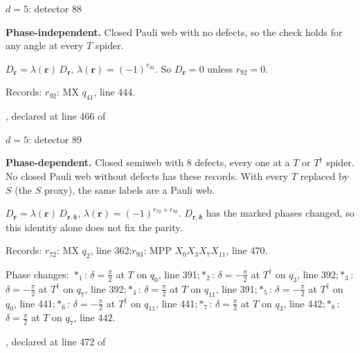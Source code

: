 \label{d5_det088}
{\Large $d=5$: detector 88}\par
\textbf{Phase-independent.} Closed Pauli web with no defects, so the check holds for any angle at every $T$ spider.
\begin{center}
\end{center}
\vspace{-1mm}
$D_{\boldsymbol r}=\lambda(\boldsymbol r)\,D_{\boldsymbol r}$, \quad $\lambda(\boldsymbol r)=(-1)^{r_{92}}$. \qquad So $D_{\boldsymbol r}=0$ unless $r_{92}=0$.
\par\smallskip\begin{minipage}{.98\linewidth}\small Records: $r_{92}$: MX $q_{41}$, line 444.\end{minipage}
\vfill
{\footnotesize\texttt{}, declared at line 466 of \texttt{}}
\newpage

\label{d5_det089}
{\Large $d=5$: detector 89}\par
\textbf{Phase-dependent.} Closed semiweb with 8 defects, every one at a $T$ or $T^\dagger$ spider. No closed Pauli web without defects has these records. With every $T$ replaced by $S$ (the $S$ proxy), the same labels are a Pauli web.
\begin{center}
\end{center}
\vspace{-1mm}
$D_{\boldsymbol r}=\lambda(\boldsymbol r)\,D_{\boldsymbol r,\boldsymbol\delta}$, \quad $\lambda(\boldsymbol r)=(-1)^{r_{72}+r_{93}}$. \qquad $D_{\boldsymbol r,\boldsymbol\delta}$ has the marked phases changed, so this identity alone does not fix the parity.
\par\smallskip\begin{minipage}{.98\linewidth}\small Records: $r_{72}$: MX $q_{2}$, line 362;\quad $r_{93}$: MPP $X_{0}X_{3}X_{7}X_{11}$, line 470.\end{minipage}
\par\smallskip\begin{minipage}{.98\linewidth}\small Phase changes: $\ast_{1}$: $\delta=\frac{\pi}{2}$ at $T$ on $q_{0}$, line 391;\quad $\ast_{2}$: $\delta=-\frac{\pi}{2}$ at $T^\dagger$ on $q_{3}$, line 392;\quad $\ast_{3}$: $\delta=-\frac{\pi}{2}$ at $T^\dagger$ on $q_{7}$, line 392;\quad $\ast_{4}$: $\delta=\frac{\pi}{2}$ at $T$ on $q_{11}$, line 391;\quad $\ast_{5}$: $\delta=-\frac{\pi}{2}$ at $T^\dagger$ on $q_{0}$, line 441;\quad $\ast_{6}$: $\delta=-\frac{\pi}{2}$ at $T^\dagger$ on $q_{11}$, line 441;\quad $\ast_{7}$: $\delta=\frac{\pi}{2}$ at $T$ on $q_{3}$, line 442;\quad $\ast_{8}$: $\delta=\frac{\pi}{2}$ at $T$ on $q_{7}$, line 442.\end{minipage}
\vfill
{\footnotesize\texttt{}, declared at line 472 of \texttt{}}
\newpage

